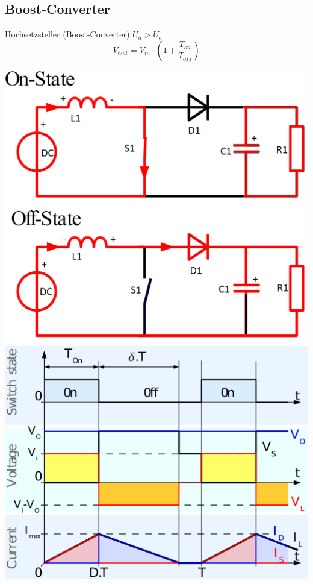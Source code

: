 \subsection{Boost-Converter}
\begin{minipage}{0.75\linewidth}
    Hochsetzsteller (Boost-Converter) $U_a > U_e  $\newline
    \[ V_{Out}=V_{in}\cdot \left(1+\frac{T_{on}}{T_{off}} \right)\]
    
\end{minipage}
\begin{minipage}{0.25\linewidth}
    \vspace{-3cm}
    \includegraphics[width=\linewidth]{images/BoostOnOff}
    \includegraphics[width=\linewidth]{images/BoostSwitch}
\end{minipage}

